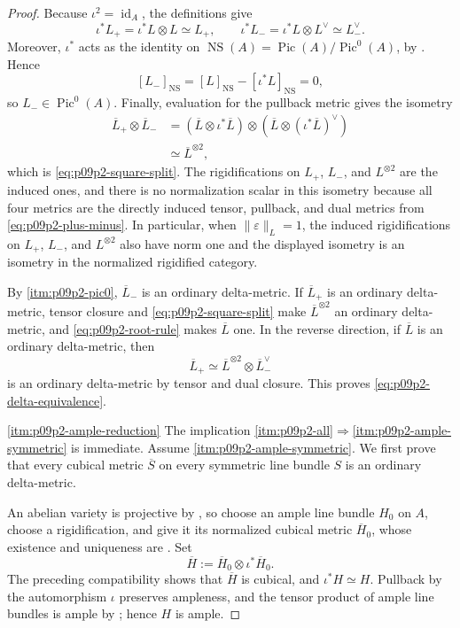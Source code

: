 \begin{proof}
Because \(\iota^2=\operatorname{id}_A\), the definitions give
\[
 \iota^*L_+
   =\iota^*L\otimes L\simeq L_+,
 \qquad
 \iota^*L_-
   =\iota^*L\otimes L^\vee\simeq L_-^\vee.
\]
Moreover, \(\iota^*\) acts as the identity on
\(\operatorname{NS}(A)=\operatorname{Pic}(A)/\operatorname{Pic}^0(A)\),
by \cite[Remark~10.19]{milneAV}.  Hence
\[
 [L_-]_{\operatorname{NS}}
   =[L]_{\operatorname{NS}}-[\iota^*L]_{\operatorname{NS}}=0,
\]
so \(L_-\in\operatorname{Pic}^0(A)\).  Finally, evaluation for the pullback
metric gives the isometry
\[
 \begin{aligned}
 \overline L_+\otimes\overline L_-
  &=(\overline L\otimes\iota^*\overline L)
    \otimes(\overline L\otimes(\iota^*\overline L)^\vee)\\
  &\simeq \overline L^{\otimes2},
 \end{aligned}
\]
which is \eqref{eq:p09p2-square-split}.  The rigidifications on
\(L_+\), \(L_-\), and \(L^{\otimes2}\) are the induced ones, and there is no
normalization scalar in this isometry because all four metrics are the
directly induced tensor, pullback, and dual metrics from
\eqref{eq:p09p2-plus-minus}.  In particular, when
\(\|\varepsilon\|_L=1\), the induced rigidifications on \(L_+\), \(L_-\),
and \(L^{\otimes2}\) also have norm one and the displayed isometry is an
isometry in the normalized rigidified category.

By \cref{itm:p09p2-pic0}, \(\overline L_-\) is an ordinary delta-metric.  If
\(\overline L_+\) is an ordinary delta-metric, tensor closure and
\eqref{eq:p09p2-square-split} make \(\overline L^{\otimes2}\) an ordinary
delta-metric, and \eqref{eq:p09p2-root-rule} makes \(\overline L\) one.  In
the reverse direction, if \(\overline L\) is an ordinary delta-metric, then
\[
       \overline L_+
       \simeq
       \overline L^{\otimes2}\otimes\overline L_-^\vee
\]
is an ordinary delta-metric by tensor and dual closure.  This proves
\eqref{eq:p09p2-delta-equivalence}.

\cref{itm:p09p2-ample-reduction}
The implication
\cref{itm:p09p2-all}\(\Rightarrow\)\cref{itm:p09p2-ample-symmetric} is
immediate.  Assume \cref{itm:p09p2-ample-symmetric}.  We first prove that
every cubical metric \(\overline S\) on every symmetric line bundle \(S\)
is an ordinary delta-metric.

An abelian variety is projective by
\cite[Lemma~39.9.2]{stacks-project}, so choose an ample line bundle \(H_0\)
on \(A\), choose a rigidification, and give it its normalized cubical metric
\(\overline H_0\), whose existence and uniqueness are
\cite[Lemmas~19.1.4 and 19.1.6]{CLD25}.  Set
\[
                 \overline H
        :=\overline H_0\otimes\iota^*\overline H_0.
\]
The preceding compatibility shows that \(\overline H\) is cubical, and
\(\iota^*H\simeq H\).  Pullback by the automorphism \(\iota\) preserves
ampleness, and the tensor product of ample line bundles is ample by
\cite[Lemma~28.27.5, Tag~0890]{stacks-project}; hence \(H\) is ample.


\end{proof}

